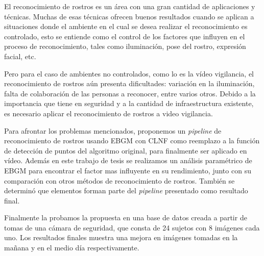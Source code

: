 \begin{resumen}

El reconocimiento de rostros es un área con una gran cantidad de aplicaciones y técnicas. 
Muchas de esas técnicas ofrecen buenos resultados cuando se aplican a situaciones donde el ambiente en el cual se desea realizar el reconocimiento es controlado, esto se entiende como el control de los factores que influyen en el proceso de reconocimiento, tales como iluminación, pose del rostro, expresión facial, etc.

Pero para el caso de ambientes no controlados, como lo es la vídeo vigilancia, el reconocimiento de rostros aún presenta dificultades: variación en la iluminación, falta de colaboración de las personas a reconocer, entre varios otros.
Debido a la importancia que tiene en seguridad y a la cantidad de infraestructura existente, es necesario aplicar el reconocimiento de rostros a video vigilancia.


Para afrontar los problemas mencionados, proponemos un \textit{pipeline} de reconocimiento de rostros usando \ac{EBGM} con \ac{CLNF} como reemplazo a la función de detección de puntos del algoritmo original, para finalmente ser aplicado en vídeo. 
Además en este trabajo de tesis se realizamos un análisis paramétrico de \ac{EBGM} para encontrar el factor mas influyente en su rendimiento, junto con su comparación con otros métodos de reconocimiento de rostros. También se determinó que elementos forman parte del \textit{pipeline} presentado como resultado final.

Finalmente la probamos la propuesta en una base de datos creada a partir de tomas de una cámara de seguridad, que consta de 24 sujetos con 8 imágenes cada uno. Los resultados finales muestra una mejora en imágenes tomadas en la mañana y en el medio día respectivamente.



\end{resumen}